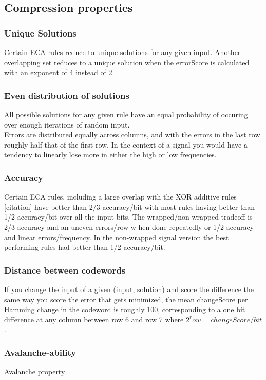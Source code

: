 \documentclass[11pt]{article}
\begin{document}
\subsection{Compression properties}

\subsubsection{Unique Solutions}
Certain ECA rules reduce to unique solutions for any given input. Another overlapping set
reduces to a unique solution when the errorScore is calculated with an exponent of 4 instead of 2.
\\
\subsubsection{Even distribution of solutions}
All possible solutions for any given rule have an equal probability of occuring over enough
iterations of random input.
\\
Errors are distributed equally across columns, and with the errors in the last row roughly
half that of the first row. In the context of a signal you would have a tendency to linearly
lose more in either the high or low frequencies.
\\
\subsubsection{Accuracy}
Certain ECA rules, including a large overlap with the XOR additive rules [citation] have
better than 2/3 accuracy/bit with most rules having better than 1/2 accuracy/bit over all
the input bits. The wrapped/non-wrapped tradeoff is 2/3 accuracy and an uneven errors/row w
hen done repeatedly or 1/2 accuracy and linear errors/frequency. In the non-wrapped signal
version the best performing rules had better than 1/2 accuracy/bit.
\\
\subsubsection{Distance between codewords}
If you change the input of a given (input, solution) and score the difference the same way
you score the error that gets minimized, the mean changeScore per Hamming change in the
codeword is roughly 100, corresponding to a one bit difference at any column between
row 6 and row 7 where $2^row = changeScore/bit$.
\\
\subsubsection{Avalanche-ability}
Avalanche property
\end{document}
